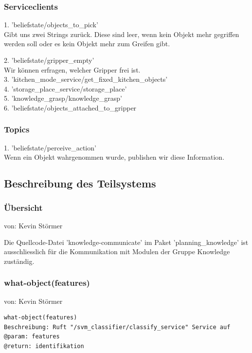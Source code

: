 \documentclass{suturo}
\makeatletter
\newcommand{\chapterauthor}[1]{%
  {\parindent0pt\vspace*{-27pt}%
  \linespread{0}\small\begin{flushright}von: #1\end{flushright}%
  \par\nobreak\vspace*{0pt}}
  \@afterheading%
}
\makeatother
\begin{document}
\subsubsection{Serviceclients}

1. 'beliefstate/objects\_to\_pick'\\
Gibt uns zwei Strings zurück. Diese sind leer, wenn kein Objekt mehr gegriffen werden soll oder es kein Objekt mehr zum Greifen gibt.

2. 'beliefstate/gripper\_empty'\\
Wir können erfragen, welcher Gripper frei ist.\\

3. 'kitchen\_mode\_service/get\_fixed\_kitchen\_objects'\\

4. 'storage\_place\_service/storage\_place'\\

5. 'knowledge\_grasp/knowledge\_grasp'\\

6. 'beliefstate/objects\_attached\_to\_gripper\\

\subsubsection{Topics}
1. 'beliefstate/perceive\_action'\\
Wenn ein Objekt wahrgenommen wurde, publishen wir diese Information.


\subsection{Beschreibung des Teilsystems}
\subsubsection{\"Ubersicht}
\chapterauthor{Kevin Störmer}
Die Quellcode-Datei 'knowledge-communicate' im Paket 'planning\_knowledge' ist ausschliesslich für die Kommunikation mit Modulen der Gruppe Knowledge zust\"andig.

\subsubsection{what-object(features)}
\chapterauthor{Kevin Störmer}
\begin{verbatim}
what-object(features)
Beschreibung: Ruft "/svm_classifier/classify_service" Service auf
@param: features
@return: identifikation
\end{verbatim}
\end{document}
